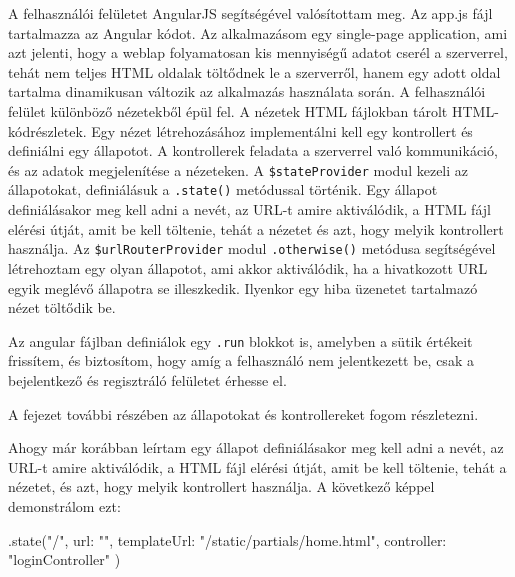 A felhasználói felületet AngularJS segítségével valósítottam meg. Az app.js fájl tartalmazza az Angular kódot. Az alkalmazásom egy single-page application, ami azt jelenti, hogy a weblap folyamatosan kis mennyiségű adatot cserél a szerverrel, tehát nem teljes HTML oldalak töltődnek le a szerverről, hanem egy adott oldal tartalma dinamikusan változik az alkalmazás használata során. A felhasználói felület különböző nézetekből épül fel. A nézetek HTML fájlokban tárolt HTML-kódrészletek. Egy nézet létrehozásához implementálni kell egy kontrollert és definiálni egy állapotot. A kontrollerek feladata a szerverrel való kommunikáció, és az adatok megjelenítése a nézeteken. A \texttt{\$stateProvider} modul kezeli az állapotokat, definiálásuk a \texttt{.state()} metódussal történik. Egy állapot definiálásakor meg kell adni a nevét, az URL-t amire aktiválódik, a HTML fájl elérési útját, amit be kell töltenie, tehát a nézetet és azt, hogy melyik kontrollert használja. Az \texttt{\$urlRouterProvider} modul \texttt{.otherwise()} metódusa segítségével létrehoztam egy olyan állapotot, ami akkor aktiválódik, ha a hivatkozott URL egyik meglévő állapotra se illeszkedik. Ilyenkor egy hiba üzenetet tartalmazó nézet töltődik be.

Az angular fájlban definiálok egy \texttt{.run} blokkot is, amelyben a sütik értékeit frissítem, és biztosítom, hogy amíg a felhasználó nem jelentkezett be, csak a bejelentkező és regisztráló felületet érhesse el.

A fejezet további részében az állapotokat és kontrollereket fogom részletezni.


Ahogy már korábban leírtam egy állapot definiálásakor meg kell adni a nevét, az URL-t amire aktiválódik, a HTML fájl elérési útját, amit be kell töltenie, tehát a nézetet, és azt, hogy melyik kontrollert használja. A következő képpel demonstrálom ezt:

\begin{cpp}
.state("/", {
    url: "",
    templateUrl: "/static/partials/home.html",
    controller: "loginController"
})
\end{cpp}

